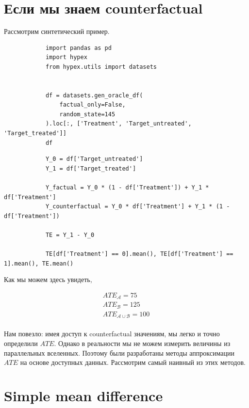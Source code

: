     \section*{Если мы знаем counterfactual}

        Рассмотрим синтетический пример.

        \begin{verbatim}
            import pandas as pd
            import hypex
            from hypex.utils import datasets


            df = datasets.gen_oracle_df(
                factual_only=False,
                random_state=145
            ).loc[:, ['Treatment', 'Target_untreated', 'Target_treated']]
            df
        \end{verbatim}


        


        \begin{verbatim}
            Y_0 = df['Target_untreated']
            Y_1 = df['Target_treated']

            Y_factual = Y_0 * (1 - df['Treatment']) + Y_1 * df['Treatment']
            Y_counterfactual = Y_0 * df['Treatment'] + Y_1 * (1 - df['Treatment'])

            TE = Y_1 - Y_0

            TE[df['Treatment'] == 0].mean(), TE[df['Treatment'] == 1].mean(), TE.mean()
        \end{verbatim}

        Как мы можем здесь увидеть,

        \begin{gather*}
            ATE_{\mathcal{A}} = 75\\
            ATE_{\mathcal{B}} = 125\\
            ATE_{\mathcal{A} \cup \mathcal{B}} = 100\\
        \end{gather*}

        Нам повезло: имея доступ к counterfactual значениям, мы легко и точно определили $ATE$.
        Однако в реальности мы не можем измерить величины из параллельных вселенных.
        Поэтому были разработаны методы аппроксимации $ATE$ на основе доступных данных.
        Рассмотрим самый наивный из этих методов.

    \section*{Simple mean difference}

